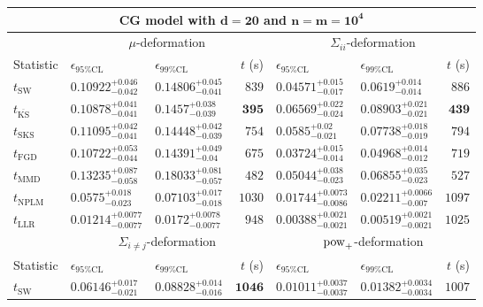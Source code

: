\begin{tabular}{l|llr|llr}
	\toprule
	\multicolumn{7}{c}{{\bf CG model with $\mathbf{d=20}$ and $\mathbf{n=m=10^{4}}$}} \\
	\toprule
	\multicolumn{1}{c}{} & \multicolumn{3}{c}{$\mu$-deformation} & \multicolumn{3}{c}{$\Sigma_{ii}$-deformation} \\
	Statistic & $\epsilon_{95\%\mathrm{CL}}$ & $\epsilon_{99\%\mathrm{CL}}$ & $t$ (s) & $\epsilon_{95\%\mathrm{CL}}$ & $\epsilon_{99\%\mathrm{CL}}$ & $t$ (s) \\
	\midrule
	$t_{\mathrm{SW}}$ & $0.10922_{-0.042}^{+0.046}$ & $0.14806_{-0.041}^{+0.045}$ & $839$ & $0.04571_{-0.017}^{+0.015}$ & $0.0619_{-0.014}^{+0.014}$ & $886$ \\
	$t_{\overline{\mathrm{KS}}}$ & $0.10878_{-0.041}^{+0.041}$ & $0.1457_{-0.039}^{+0.038}$ & ${\mathbf{395}}$ & $0.06569_{-0.024}^{+0.022}$ & $0.08903_{-0.021}^{+0.021}$ & ${\mathbf{439}}$ \\
	$t_{\mathrm{SKS}}$ & $0.11095_{-0.041}^{+0.042}$ & $0.14448_{-0.039}^{+0.042}$ & $754$ & $0.0585_{-0.021}^{+0.02}$ & $0.07738_{-0.019}^{+0.018}$ & $794$ \\
	$t_{\mathrm{FGD}}$ & ${\mathbf{0.10722_{-0.044}^{+0.053}}}$ & ${\mathbf{0.14391_{-0.04}^{+0.049}}}$ & $675$ & ${\mathbf{0.03724_{-0.014}^{+0.015}}}$ & ${\mathbf{0.04968_{-0.012}^{+0.014}}}$ & $719$ \\
	$t_{\mathrm{MMD}}$ & $0.13235_{-0.058}^{+0.087}$ & $0.18033_{-0.057}^{+0.081}$ & $482$ & $0.05044_{-0.023}^{+0.038}$ & $0.06855_{-0.023}^{+0.035}$ & $527$ \\
\rowcolor{red!35}	$t_{\mathrm{NPLM}}$ & $0.0575_{-0.023}^{+0.018}$ & $0.07103_{-0.018}^{+0.017}$ & $1030$ & $0.01744_{-0.0086}^{+0.0073}$ & $0.02211_{-0.007}^{+0.0066}$ & $1097$ \\
	$t_{\mathrm{LLR}}$ & $0.01214_{-0.0077}^{+0.0077}$ & $0.0172_{-0.0077}^{+0.0078}$ & $948$ & $0.00388_{-0.0021}^{+0.0021}$ & $0.00519_{-0.0021}^{+0.0021}$ & $1025$ \\
	\toprule
	\multicolumn{1}{c}{} & \multicolumn{3}{c}{$\Sigma_{i\neq j}$-deformation} & \multicolumn{3}{c}{$\rm{pow}_{+}$-deformation} \\
	Statistic & $\epsilon_{95\%\mathrm{CL}}$ & $\epsilon_{99\%\mathrm{CL}}$ & $t$ (s) & $\epsilon_{95\%\mathrm{CL}}$ & $\epsilon_{99\%\mathrm{CL}}$ & $t$ (s) \\
	\midrule
	$t_{\mathrm{SW}}$ & $0.06146_{-0.021}^{+0.017}$ & $0.08828_{-0.016}^{+0.014}$ & ${\mathbf{1046}}$ & $0.01011_{-0.0037}^{+0.0037}$ & $0.01382_{-0.0034}^{+0.0034}$ & $1007$ \\

\end{tabular}
